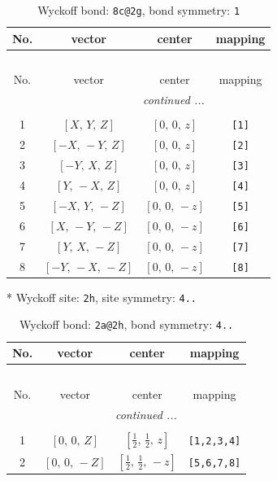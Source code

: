 \documentclass[fleqn,8pt]{jsarticle}
\begin{document}
\begin{longtable}{cccc}
\caption{Wyckoff bond: {\tt 8c@2g}, bond symmetry: {\tt 1}}
 \\
 \hline \hline
No. & vector & center & mapping \\ \hline \endfirsthead

\multicolumn{3}{l}{\tablename\ \thetable{}} \\
 \hline \hline
No. & vector & center & mapping \\ \hline \endhead

 \hline \hline
\multicolumn{3}{r}{\footnotesize\it continued ...} \\ \endfoot

 \hline \hline
\multicolumn{3}{r}{} \\ \endlastfoot

1 & $\left[ X,\, Y,\, Z \right]$ & $\left[ 0,\, 0,\, z \right]$ & {\tt [1]} \\ \hline
2 & $\left[ - X,\, - Y,\, Z \right]$ & $\left[ 0,\, 0,\, z \right]$ & {\tt [2]} \\ \hline
3 & $\left[ - Y,\, X,\, Z \right]$ & $\left[ 0,\, 0,\, z \right]$ & {\tt [3]} \\ \hline
4 & $\left[ Y,\, - X,\, Z \right]$ & $\left[ 0,\, 0,\, z \right]$ & {\tt [4]} \\ \hline
5 & $\left[ - X,\, Y,\, - Z \right]$ & $\left[ 0,\, 0,\, - z \right]$ & {\tt [5]} \\ \hline
6 & $\left[ X,\, - Y,\, - Z \right]$ & $\left[ 0,\, 0,\, - z \right]$ & {\tt [6]} \\ \hline
7 & $\left[ Y,\, X,\, - Z \right]$ & $\left[ 0,\, 0,\, - z \right]$ & {\tt [7]} \\ \hline
8 & $\left[ - Y,\, - X,\, - Z \right]$ & $\left[ 0,\, 0,\, - z \right]$ & {\tt [8]} \\
\end{longtable}
* Wyckoff site: {\tt 2h}, site symmetry: {\tt 4..}
\renewcommand{\arraystretch}{1.2}
\begin{longtable}{cccc}
\caption{Wyckoff bond: {\tt 2a@2h}, bond symmetry: {\tt 4..}}
 \\
 \hline \hline
No. & vector & center & mapping \\ \hline \endfirsthead

\multicolumn{3}{l}{\tablename\ \thetable{}} \\
 \hline \hline
No. & vector & center & mapping \\ \hline \endhead

 \hline \hline
\multicolumn{3}{r}{\footnotesize\it continued ...} \\ \endfoot

 \hline \hline
\multicolumn{3}{r}{} \\ \endlastfoot

1 & $\left[ 0,\, 0,\, Z \right]$ & $\left[ \frac{1}{2},\, \frac{1}{2},\, z \right]$ & {\tt [1,2,3,4]} \\ \hline
2 & $\left[ 0,\, 0,\, - Z \right]$ & $\left[ \frac{1}{2},\, \frac{1}{2},\, - z \right]$ & {\tt [5,6,7,8]} \\
\end{longtable}
\end{document}
